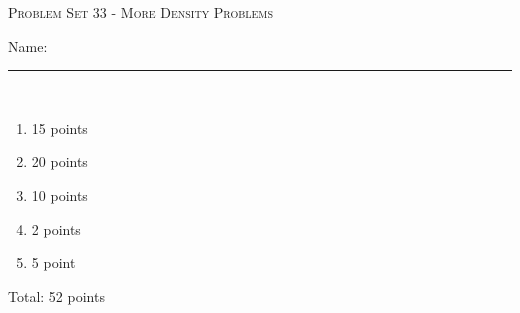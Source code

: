 \documentclass{article}
\begin{document}
\begin{center}
  \large\textsc{Problem Set 33 - More Density Problems}
  
      \pspace{12pt}
  \begin{problemonly}\large Name: \rule{5cm}{0.15mm}\\ \end{problemonly}
\end{center}

\begin{grading}
  
    \begin{enumerate}[nosep]
    \item 15 points 
    \item 20 points 
    \item 10 points
    \item 2 points
    \item 5 point
    \end{enumerate}

    Total: 52 points
  
\end{grading}
\end{document}
